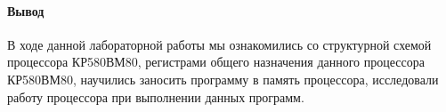 \documentclass[a4paper,14pt]{extarticle}
\begin{document}
\paragraph{Вывод}В ходе данной лабораторной работы мы ознакомились со структурной схемой процессора КР580ВМ80, регистрами общего назначения данного процессора КР580ВМ80, научились заносить программу в память процессора, исследовали работу процессора при выполнении данных программ.
\end{document}
